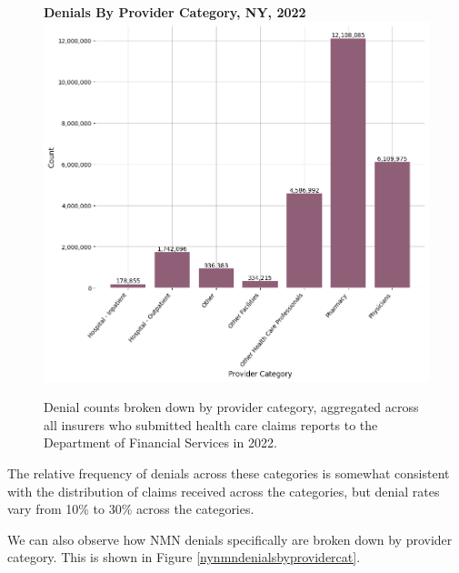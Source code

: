 \documentclass[12pt, a4paper,twoside]{report}
\theoremstyle{plain} %
\theoremstyle{definition} %
\theoremstyle{remark} %
\numberwithin{equation}{chapter}
\begin{document}
	
		\begin{figure}[h!]
			\centering
			\textbf{Denials By Provider Category, NY, 2022}
			\includegraphics[width=\columnwidth]{images/ny_claim_reports/denials_by_provider_cat.png}
			\caption{Denial counts broken down by provider category, aggregated across all insurers who submitted health care claims reports to the Department of Financial Services in 2022.}
			\label{nydenialsbyprovidercat}
		\end{figure}
	
		\clearpage
	
		The relative frequency of denials across these categories is somewhat consistent with the distribution of claims received across the categories, but denial rates vary from 10\% to 30\% across the categories.
		
		We can also observe how NMN denials specifically are broken down by provider category. This is shown in Figure \ref{nynmndenialsbyprovidercat}.
		
\end{document}
